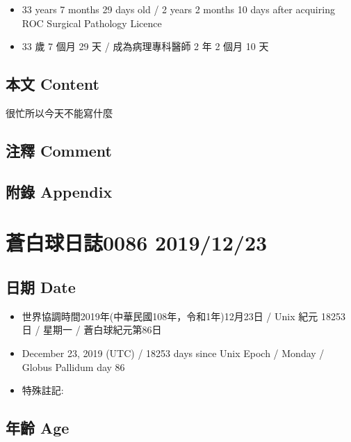 \documentclass[
]{article}
\providecommand{\tightlist}{%
  \setlength{\itemsep}{0pt}\setlength{\parskip}{0pt}}
\begin{document}
\begin{itemize}
\tightlist
\item
  33 years 7 months 29 days old / 2 years 2 months 10 days after
  acquiring ROC Surgical Pathology Licence
\item
  33 歲 7 個月 29 天 / 成為病理專科醫師 2 年 2 個月 10 天
\end{itemize}

\hypertarget{ux672cux6587-content-21}{%
\subsection{本文 Content}\label{ux672cux6587-content-21}}

很忙所以今天不能寫什麼

\hypertarget{ux6ce8ux91cb-comment-20}{%
\subsection{注釋 Comment}\label{ux6ce8ux91cb-comment-20}}

\hypertarget{ux9644ux9304-appendix-21}{%
\subsection{附錄 Appendix}\label{ux9644ux9304-appendix-21}}

\hypertarget{ux84bcux767dux7403ux65e5ux8a8c0086-20191223}{%
\section{蒼白球日誌0086
2019/12/23}\label{ux84bcux767dux7403ux65e5ux8a8c0086-20191223}}

\hypertarget{ux65e5ux671f-date-22}{%
\subsection{日期 Date}\label{ux65e5ux671f-date-22}}

\begin{itemize}
\tightlist
\item
  世界協調時間2019年(中華民國108年，令和1年)12月23日 / Unix 紀元 18253
  日 / 星期一 / 蒼白球紀元第86日
\item
  December 23, 2019 (UTC) / 18253 days since Unix Epoch / Monday /
  Globus Pallidum day 86
\item
  特殊註記:
\end{itemize}

\hypertarget{ux5e74ux9f61-age-22}{%
\subsection{年齡 Age}\label{ux5e74ux9f61-age-22}}
\end{document}
